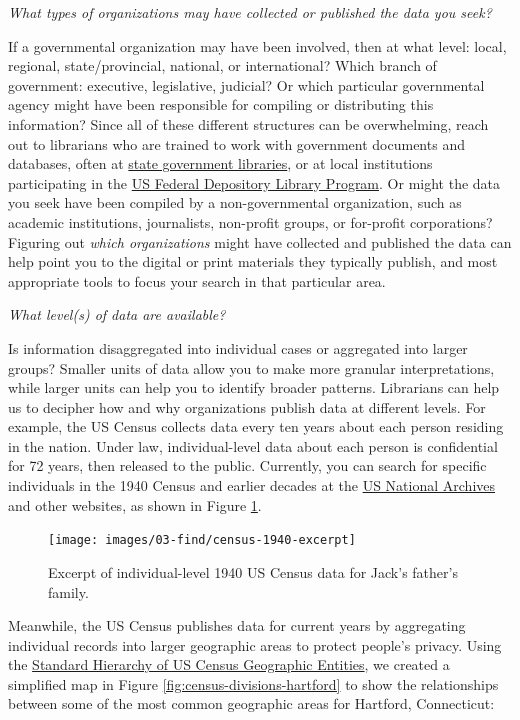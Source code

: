 \documentclass[
  english,
]{book}
\begin{document}
\emph{What types of organizations may have collected or published the data you seek?}

If a governmental organization may have been involved, then at what level: local, regional, state/provincial, national, or international? Which branch of government: executive, legislative, judicial? Or which particular governmental agency might have been responsible for compiling or distributing this information? Since all of these different structures can be overwhelming, reach out to librarians who are trained to work with government documents and databases, often at \href{https://libguides.ala.org/mailing-lists}{state government libraries}, or at local institutions participating in the \href{https://www.doi.gov/library/collections/federal-documents}{US Federal Depository Library Program}. Or might the data you seek have been compiled by a non-governmental organization, such as academic institutions, journalists, non-profit groups, or for-profit corporations? Figuring out \emph{which organizations} might have collected and published the data can help point you to the digital or print materials they typically publish, and most appropriate tools to focus your search in that particular area.

\emph{What level(s) of data are available?}

Is information disaggregated into individual cases or aggregated into larger groups? Smaller units of data allow you to make more granular interpretations, while larger units can help you to identify broader patterns. Librarians can help us to decipher how and why organizations publish data at different levels. For example, the US Census collects data every ten years about each person residing in the nation. Under law, individual-level data about each person is confidential for 72 years, then released to the public. Currently, you can search for specific individuals in the 1940 Census and earlier decades at the \href{https://www.archives.gov/research/genealogy/census/about}{US National Archives} and other websites, as shown in Figure \ref{fig:census-1940-excerpt}.



\begin{figure}
\texttt{[image: images/03-find/census-1940-excerpt]} \caption{Excerpt of individual-level 1940 US Census data for Jack's father's family.}\label{fig:census-1940-excerpt}
\end{figure}

Meanwhile, the US Census publishes data for current years by aggregating individual records into larger geographic areas to protect people's privacy. Using the \href{https://www2.census.gov/geo/pdfs/reference/geodiagram.pdf}{Standard Hierarchy of US Census Geographic Entities}, we created a simplified map in Figure \ref{fig:census-divisions-hartford} to show the relationships between some of the most common geographic areas for Hartford, Connecticut:
\end{document}
